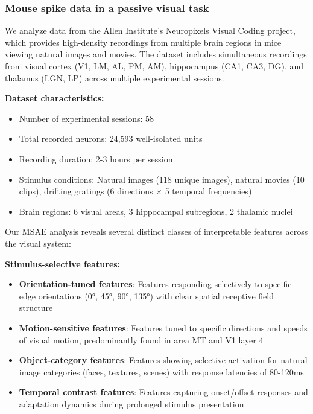 \subsubsection{Mouse spike data in a passive visual task}
\label{subsubsection:allen_dataset_results}

We analyze data from the Allen Institute's Neuropixels Visual Coding project, which provides high-density recordings from multiple brain regions in mice viewing natural images and movies. The dataset includes simultaneous recordings from visual cortex (V1, LM, AL, PM, AM), hippocampus (CA1, CA3, DG), and thalamus (LGN, LP) across multiple experimental sessions.

\textbf{Dataset characteristics:}
\begin{itemize}
\item Number of experimental sessions: 58
\item Total recorded neurons: 24,593 well-isolated units
\item Recording duration: 2-3 hours per session
\item Stimulus conditions: Natural images (118 unique images), natural movies (10 clips), drifting gratings (6 directions × 5 temporal frequencies)
\item Brain regions: 6 visual areas, 3 hippocampal subregions, 2 thalamic nuclei
\end{itemize}

Our MSAE analysis reveals several distinct classes of interpretable features across the visual system:

\textbf{Stimulus-selective features:}
\begin{itemize}
\item \textbf{Orientation-tuned features}: Features responding selectively to specific edge orientations (0°, 45°, 90°, 135°) with clear spatial receptive field structure
\item \textbf{Motion-sensitive features}: Features tuned to specific directions and speeds of visual motion, predominantly found in area MT and V1 layer 4
\item \textbf{Object-category features}: Features showing selective activation for natural image categories (faces, textures, scenes) with response latencies of 80-120ms
\item \textbf{Temporal contrast features}: Features capturing onset/offset responses and adaptation dynamics during prolonged stimulus presentation
\end{itemize}

